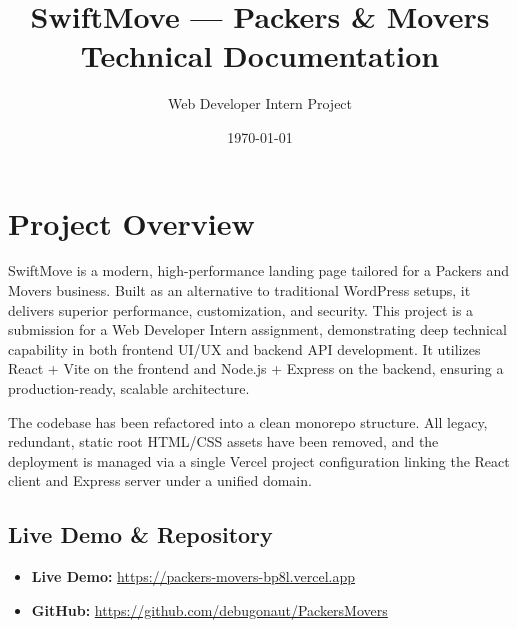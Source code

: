 \documentclass[11pt,a4paper]{article}
\title{\textbf{SwiftMove — Packers \& Movers}\\Technical Documentation}
\author{Web Developer Intern Project}
\date{\today}
\begin{document}
\maketitle
\tableofcontents
\newpage

\section{Project Overview}
SwiftMove is a modern, high-performance landing page tailored for a Packers and Movers business. Built as an alternative to traditional WordPress setups, it delivers superior performance, customization, and security. This project is a submission for a Web Developer Intern assignment, demonstrating deep technical capability in both frontend UI/UX and backend API development. It utilizes React + Vite on the frontend and Node.js + Express on the backend, ensuring a production-ready, scalable architecture.

The codebase has been refactored into a clean monorepo structure. All legacy, redundant, static root HTML/CSS assets have been removed, and the deployment is managed via a single Vercel project configuration linking the React client and Express server under a unified domain.

\subsection*{Live Demo \& Repository}
\begin{itemize}
    \item \textbf{Live Demo:} \href{https://packers-movers-bp8l.vercel.app}{https://packers-movers-bp8l.vercel.app}
    \item \textbf{GitHub:} \href{https://github.com/debugonaut/PackersMovers}{https://github.com/debugonaut/PackersMovers}
\end{itemize}
\end{document}
